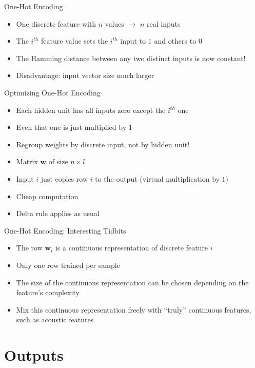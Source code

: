 \documentclass[size=14pt,
  style=tycja,
  paper=screen,
  ]{powerdot}
\begin{document}
\begin{slide}{One-Hot Encoding}
  \begin{itemize}
  \item One discrete feature with $n$ values $\rightarrow$ $n$ real inputs
  \item The $i^{th}$ feature value sets the $i^{th}$ input to $1$ and others to $0$
  \item The Hamming distance between any two distinct inputs is now constant!
  \item Disadvantage: input vector size much larger
  \end{itemize}
\end{slide}

\begin{slide}{Optimizing One-Hot Encoding}
  \begin{itemize}
  \item Each hidden unit has all inputs zero except the $i^{th}$ one
  \item Even that one is just multiplied by $1$
  \item Regroup weights by discrete input, not by hidden unit!
  \item Matrix $\mathbf w$ of size $n \times l$
  \item Input $i$ just copies row $i$ to the output (virtual multiplication by $1$)
  \item Cheap computation
  \item Delta rule applies as usual
  \end{itemize}
\end{slide}

\begin{slide}{One-Hot Encoding: Interesting Tidbits}
  \begin{itemize}
  \item The row $\mathbf w_i$ is a continuous representation of discrete feature $i$
  \item Only one row trained per sample
  \item  The  size of  the  continuous  representation  can be  chosen
    depending on the feature's complexity
  \item  Mix  this  continuous  representation freely  with  ``truly''
    continuous features, such as acoustic features
  \end{itemize}
\end{slide}

\section{Outputs}
\end{document}
